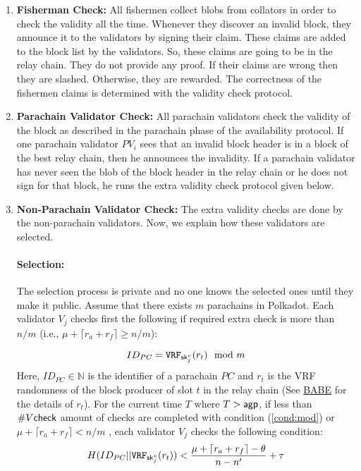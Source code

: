 \begin{enumerate}

      
    \item \textbf{Fisherman Check:} All fishermen collect blobs from collators in order to check the validity all the time. Whenever they discover an invalid block, they announce it to the validators by signing their claim. These claims are added to the block list by the validators. So, these claims are going to be in the relay chain. They do not provide any proof. If their claims are wrong then they are slashed. Otherwise, they are rewarded. The correctness of the fishermen claims is determined with the validity check protocol.
    
    \item \textbf{Parachain Validator Check:} All parachain validators check the validity of the block as described in the parachain phase of the availability protocol. If one parachain validator $PV_i$ sees that an invalid block header is in a block of the best relay chain, then he announces the invalidity. If a parachain validator has never seen the blob of the block header in the relay chain or he does not sign for that block, he runs the extra validity check protocol given below.
    
    \item \textbf{Non-Parachain Validator Check:} The extra validity checks are done by the non-parachain validators. Now, we explain how these validators are selected.
    
    \paragraph{Selection:} The selection process is private and no one knows the selected ones until they make it public. Assume that there exists $m$ parachains in Polkadot. Each validator $V_j$ checks first the following if required extra check is more than $n/m$ (i.e., $\mu + \lceil r_a + r_f \rceil \geq n/m$): 
    
    \begin{equation}\label{cond:mod}
        ID_{PC} = \mathtt{VRF}_{\mathsf{sk}^v_{j}}(r_{t}) \mod m    
    \end{equation}
     Here, $ID_{PC} \in \mathbb{N}$ is the identifier of a parachain $PC$ and $r_{t}$ is the VRF randomness of the block producer of slot $t$ in the relay chain (See \href{http://research.web3.foundation/en/latest/polkadot/BABE/Babe/}{BABE} for the details of $r_t$). For the current time $T$ where $T > \mathsf{agp}$, if  less than $\#V\mathsf{check}$ amount of checks are completed with condition (\ref{cond:mod}) or $\mu + \lceil r_a + r_f \rceil < n/m$ , each validator $V_j$ checks the following condition:
     \begin{equation}\label{cond:time}
        H(ID_{PC} || \mathtt{VRF}_{\mathsf{sk}^v_j}(r_t)) < \frac{\mu + \lceil r_a + r_f \rceil - \theta}{n-n'}+\tau  
    \end{equation}
    

\end{enumerate}
